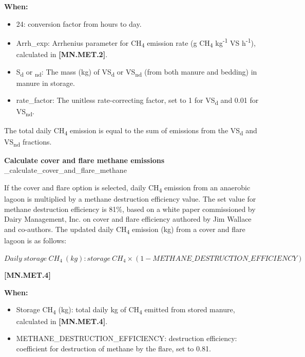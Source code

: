 \begin{refsection}
    \textbf{When:}
    \begin{itemize}
        \item 24: conversion factor from hours to day. 
        \item Arrh\_exp: Arrhenius parameter for CH\textsubscript{4} emission rate (g CH\textsubscript{4} kg\textsuperscript{-1} VS h\textsuperscript{-1}), calculated in \textbf{[MN.MET.2]}. 
        \item S\textsubscript{d} or \textsubscript{nd}: The mass (kg) of VS\textsubscript{d} or VS\textsubscript{nd} (from both manure and bedding) in manure in storage.
        \item rate\_factor: The unitless rate-correcting factor, set to 1 for VS\textsubscript{d} and 0.01 for VS\textsubscript{nd}. 
    \end{itemize}
    \vspace{0.5cm}

    The total daily CH\textsubscript{4} emission is equal to the sum of emissions from the VS\textsubscript{d} and VS\textsubscript{nd} fractions.
    \vspace{0.5cm}
    
    \textbf{Calculate cover and flare methane emissions}\\
    \_calculate\_cover\_and\_flare\_methane
    \vspace{0.2cm}

    If the cover and flare option is selected, daily CH\textsubscript{4} emission from an anaerobic lagoon is multiplied by a methane destruction efficiency value. The set value for methane destruction efficiency is 81\%, based on a white paper commissioned by Dairy Management, Inc. on cover and flare efficiency authored by Jim Wallace and co-authors. The updated daily CH\textsubscript{4} emission (kg) from a cover and flare lagoon is as follows:
\vspace{0.5cm}

    \begin{center}
\(Daily\ storage\ CH_{4}\ (kg) : storage\ CH_{4} \times (1 - METHANE\_DESTRUCTION\_EFFICIENCY)\)
    \end{center}
        \vspace{0.5cm} 
    
            {\raggedleft \textbf{[MN.MET.4]}\par}
            \vspace{0.5cm}

    \textbf{When:}
    \begin{itemize}
        \item Storage CH\textsubscript{4} (kg): total daily kg of CH\textsubscript{4} emitted from stored manure, calculated in \textbf{[MN.MET.4]}.
        \item METHANE\_DESTRUCTION\_EFFICIENCY: destruction efficiency: coefficient for destruction of methane by the flare, set to 0.81.


\end{itemize}
\end{refsection}
